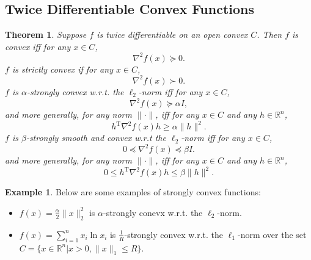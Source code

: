 \documentclass[openany]{book}
\newtheorem{theorem}{Theorem}[chapter]
\theoremstyle{definition}
\newtheorem{example}{Example}[chapter]
\theoremstyle{remark}
\begin{document}
\subsection{Twice Differentiable Convex Functions}
\begin{theorem}
    Suppose $f$ is twice differentiable on an open convex $C$. Then $f$ is convex iff for any $x\in C$,
    \begin{equation}\label{convSO}
    \nabla^2f(x)\succeq0.
    \end{equation}
    $f$ is strictly convex if for any $x\in C$,
    \begin{equation}\label{sConvSO}
    \nabla^2f(x)\succ0.
    \end{equation}
    $f$ is $\alpha$-strongly convex w.r.t. the $\ell_2$-norm iff for any $x\in C$,
    \begin{equation}\label{strConvSO}
    \nabla^2f(x)\succeq\alpha I,
    \end{equation}
    and more generally, for any norm $\|\cdot\|$, iff for any $x\in C$ and any $h\in \mathbb{R}^n$,
    \begin{equation}
        h^{\mathrm{T}}\nabla^2f(x)h\ge\alpha\|h\|^2.
    \end{equation}
    $f$ is $\beta$-strongly smooth and convex w.r.t the $\ell_2$-norm iff for any $x\in C$,
    \begin{equation}\label{smoConvSO}
    0\preceq\nabla^2f(x)\preceq\beta I.
    \end{equation}
    and more generally, for any norm $\|\cdot\|$, iff for any $x\in C$ and any $h\in \mathbb{R}^n$,
    \begin{equation}
        0\le h^{\mathrm{T}}\nabla^2f(x)h\le\beta\|h\|^2.
    \end{equation}
\end{theorem}

\begin{example}
    Below are some examples of strongly convex functions:
    \begin{itemize}
        \item $f(x)=\frac{\alpha}{2}\|x\|_2^2$ is $\alpha$-strongly conevx w.r.t. the $\ell_2$-norm.
        \item $f(x)=\sum_{i=1}^{n}x_i\ln x_i$ is $\frac{1}{R}$-strongly convex w.r.t. the $\ell_1$-norm over the set $C=\{x\in \mathbb{R}^n|x>0,\|x\|_1\le R\}$.
    \end{itemize}
\end{example}
\end{document}
